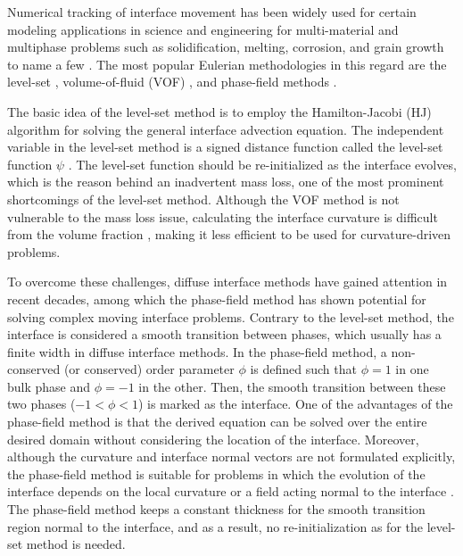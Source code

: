 
Numerical tracking of interface movement has been widely used for certain modeling applications in science and engineering for multi-material and multiphase problems such as solidification, melting, corrosion, and grain growth to name a few \cite{Sun2007}. The most popular Eulerian methodologies in this regard are the level-set \cite{Osher1988,Andrew2000,RonaldFedkiw2002}, volume-of-fluid (\gls{VOF}) \cite{Rider1998}, and phase-field methods \cite{Boettinger2002,Bellemans2017}.


The basic idea of the level-set method is to employ the Hamilton-Jacobi (\gls{HJ}) algorithm for solving the general interface advection equation. The independent variable in the level-set method is a signed distance function called the level-set function $\psi$ \cite{RonaldFedkiw2002}. The level-set function should be re-initialized as the interface evolves, which is the reason behind an inadvertent mass loss, one of the most prominent shortcomings of the level-set method. Although the \gls{VOF} method is not vulnerable to the mass loss issue, calculating the interface curvature is difficult from the volume fraction \cite{Sun2007}, making it less efficient to be used for curvature-driven problems.

To overcome these challenges, diffuse interface methods \cite{Anderson1998} have gained attention in recent decades, among which the phase-field method has shown potential for solving complex moving interface problems. Contrary to the level-set method, the interface is considered a smooth transition between phases, which usually has a finite width in diffuse interface methods. In the phase-field method, a non-conserved (or conserved) order parameter $\phi$ is defined such that $\phi=1$ in one bulk phase and $\phi=-1$ in the other. Then, the smooth transition between these two phases ($-1<\phi<1$) is marked as the interface. One of the advantages of the phase-field method is that the derived equation can be solved over the entire desired domain without considering the location of the interface. Moreover, although the curvature and interface normal vectors are not formulated explicitly, the phase-field method is suitable for problems in which the evolution of the interface depends on the local curvature or a field acting normal to the interface \cite{Sun2007}. The phase-field method keeps a constant thickness for the smooth transition region normal to the interface, and as a result, no re-initialization as for the level-set method is needed.



